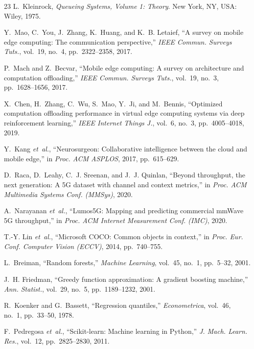 \documentclass[10pt,conference]{IEEEtran}
\begin{document}
\begin{thebibliography}{23}
L.~Kleinrock,
\textit{Queueing Systems, Volume 1: Theory}.
New York, NY, USA: Wiley, 1975.

Y.~Mao, C.~You, J.~Zhang, K.~Huang, and K.~B. Letaief,
``A survey on mobile edge computing: The communication perspective,''
\textit{IEEE Commun. Surveys Tuts.}, vol.~19, no.~4, pp.~2322--2358, 2017.

P.~Mach and Z.~Becvar,
``Mobile edge computing: A survey on architecture and computation
offloading,''
\textit{IEEE Commun. Surveys Tuts.}, vol.~19, no.~3, pp.~1628--1656, 2017.

X.~Chen, H.~Zhang, C.~Wu, S.~Mao, Y.~Ji, and M.~Bennis,
``Optimized computation offloading performance in virtual edge computing
systems via deep reinforcement learning,''
\textit{IEEE Internet Things J.}, vol.~6, no.~3, pp.~4005--4018, 2019.

Y.~Kang \textit{et~al.},
``Neurosurgeon: Collaborative intelligence between the cloud and mobile
edge,''
in \textit{Proc. ACM ASPLOS}, 2017, pp.~615--629.

D.~Raca, D.~Leahy, C.~J. Sreenan, and J.~J. Quinlan,
``Beyond throughput, the next generation: A 5G dataset with channel and
context metrics,''
in \textit{Proc. ACM Multimedia Systems Conf. (MMSys)}, 2020.

A.~Narayanan \textit{et~al.},
``Lumos5G: Mapping and predicting commercial mmWave 5G throughput,''
in \textit{Proc. ACM Internet Measurement Conf. (IMC)}, 2020.

T.-Y. Lin \textit{et~al.},
``Microsoft COCO: Common objects in context,''
in \textit{Proc. Eur. Conf. Computer Vision (ECCV)}, 2014, pp.~740--755.

L.~Breiman,
``Random forests,''
\textit{Machine Learning}, vol.~45, no.~1, pp.~5--32, 2001.

J.~H. Friedman,
``Greedy function approximation: A gradient boosting machine,''
\textit{Ann. Statist.}, vol.~29, no.~5, pp.~1189--1232, 2001.

R.~Koenker and G.~Bassett,
``Regression quantiles,''
\textit{Econometrica}, vol.~46, no.~1, pp.~33--50, 1978.

F.~Pedregosa \textit{et~al.},
``Scikit-learn: Machine learning in Python,''
\textit{J. Mach. Learn. Res.}, vol.~12, pp.~2825--2830, 2011.

\end{thebibliography}
\end{document}

